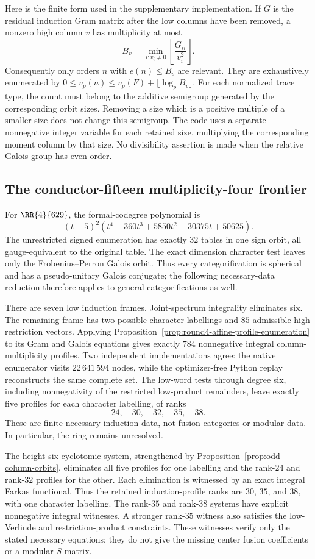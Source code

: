 Here is the finite form used in the supplementary implementation.  If $G$
is the residual induction Gram matrix after the low columns have been
removed, a nonzero high column $v$ has multiplicity at most
\[
 B_v=\min_{i:v_i\ne0}\left\lfloor\frac{G_{ii}}{v_i^2}\right\rfloor.
\]
Consequently only orders $n$ with $e(n)\le B_v$ are relevant.  They are
exhaustively enumerated by
$0\le v_p(n)\le v_p(F)+\lfloor\log_p B_v\rfloor$.
For each normalized trace type, the count must belong to the additive
semigroup generated by the corresponding orbit sizes.  Removing a size
which is a positive multiple of a smaller size does not change this
semigroup.  The code uses a separate nonnegative integer variable for each
retained size, multiplying the corresponding moment column by that size.
No divisibility assertion is made when the relative Galois group has even
order.

\subsection{The conductor-fifteen multiplicity-four frontier}
For $\RR{4}{629}$, the formal-codegree polynomial is
\[
 (t-5)^2(t^4-360t^3+5850t^2-30375t+50625).
\]
The unrestricted signed enumeration has exactly $32$ tables in one sign
orbit, all gauge-equivalent to the original table.  The exact dimension
character test leaves only the Frobenius--Perron Galois orbit.  Thus every
categorification is spherical and has a pseudo-unitary Galois conjugate;
the following necessary-data reduction therefore applies to general
categorifications as well.

There are seven low induction frames.  Joint-spectrum integrality eliminates
six.  The remaining frame has two possible character labellings and $85$
admissible high restriction vectors.  Applying
Proposition~\ref{prop:round4-affine-profile-enumeration} to its Gram and
Galois equations gives exactly $784$ nonnegative integral column-multiplicity
profiles.  Two independent implementations agree: the native enumerator
visits $22\,641\,594$ nodes, while the optimizer-free Python replay
reconstructs the same complete set.  The low-word tests through degree six,
including nonnegativity of the restricted low-product remainders, leave
exactly five profiles for each character labelling, of ranks
\[
 24,\quad 30,\quad 32,\quad 35,\quad 38.
\]
These are finite necessary induction data, not fusion categories or modular
data.  In particular, the ring remains unresolved.

The height-six cyclotomic system, strengthened by
Proposition~\ref{prop:odd-column-orbits}, eliminates all five profiles for
one labelling and the rank-$24$ and rank-$32$ profiles for the other.
Each elimination is witnessed by an exact integral Farkas functional.
Thus the retained induction-profile ranks are $30$, $35$, and $38$, with
one character labelling.  The rank-$35$ and rank-$38$ systems have explicit
nonnegative integral witnesses.  A stronger rank-$35$ witness also satisfies
the low-Verlinde and restriction-product constraints.  These witnesses
verify only the stated necessary equations; they do not give the missing
center fusion coefficients or a modular $S$-matrix.
